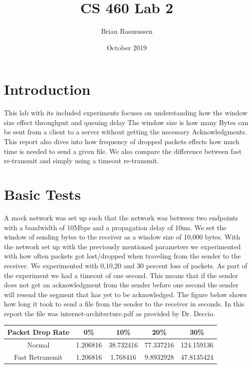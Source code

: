 \documentclass{article}
\title{CS 460 Lab 2}
\author{Brian Rasmussen}
\date{October 2019}
\begin{document}
\maketitle

\section{Introduction}
This lab with its included experiments focuses on understanding how the window size effect throughput and queuing delay
The window size is how many Bytes can be sent from a client to a server without getting the necessary Acknowledgments.
This report also dives into how frequency of dropped packets effects how much time is needed to send a given file.
We also compare the difference between fast re-transmit and simply using a timeout re-transmit. 


\section{Basic Tests}
A mock network was set up such that the network was between two endpoints with a bandwidth of 10Mbps and a propagation delay of 10ms.
We set the window of sending bytes to the receiver as a window size of 10,000 bytes.
With the network set up with the previously mentioned parameters we experimented with how often packets got lost/dropped when traveling from the sender to the receiver.
We experimented with 0,10,20 and 30 percent loss of packets.
As part of the experiment we had a timeout of one second.
This means that if the sender does not get an acknowledgment from the sender before one second the sender will resend the segment that has yet to be acknowledged.
The figure below shows how long it took to send a file from the sender to the receiver in seconds.
In this report the file was internet-architecture.pdf as provided by Dr. Deccio.

\begin{center}
 \begin{tabular}{|c | c c c c|} 
 \hline
 Packet Drop Rate & 0\% & 10\% & 20\% & 30\% \\ [0.5ex] 
 \hline
 Normal & 1.206816 & 38.732416 & 77.337216 & 124.159136 \\ 
 \hline
 Fast Retransmit & 1.206816 & 1.768416 & 9.8932928 & 47.8135424  \\
 \hline
\end{tabular}
\end{center}
\end{document}
